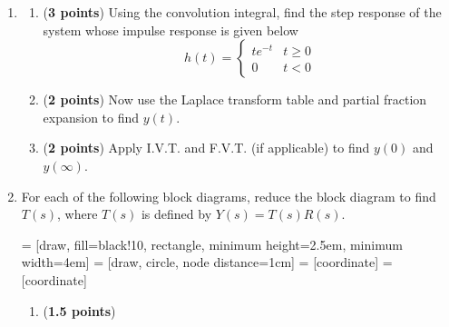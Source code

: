 \documentclass[]{article}
\begin{document}
\begin{enumerate}
    \item
    \begin{enumerate}
        \item (\textbf{3 points}) Using the convolution integral, find the step response of the system whose impulse response is given below
        \[
            h(t)=
            \begin{cases}
                te^{-t} & t \geq 0\\
                0       & t < 0
            \end{cases}
        \]
        \item (\textbf{2 points}) Now use the Laplace transform table and partial fraction expansion to find $y(t)$.
        \item (\textbf{2 points}) Apply I.V.T. and F.V.T. (if applicable) to find $y(0)$ and $y(\infty)$.
    \end{enumerate}
    \vspace{0.4 cm}

    \item For each of the following block diagrams, reduce the block diagram to find $T(s)$, where $T(s)$ is defined by $Y(s)=T(s)R(s)$.
    
     = [draw, fill=black!10, rectangle, minimum height=2.5em, minimum width=4em]
     = [draw, circle, node distance=1cm]
     = [coordinate]
     = [coordinate]
    
    \begin{enumerate}
        \item (\textbf{1.5 points}) \leavevmode\vadjust{\vspace{-\baselineskip}}\newline %
\end{enumerate}
\end{enumerate}
\end{document}
